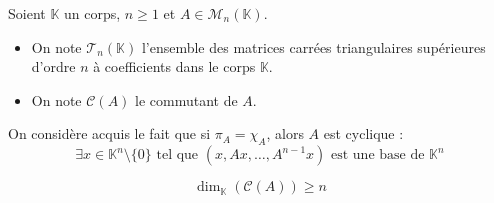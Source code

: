 





  Soient $\mathbb{K}$ un corps, $n \geq 1$ et $A \in \mathcal{M}_n(\mathbb{K})$.

  \begin{notation}
    \begin{itemize}
      \item On note $\mathcal{T}_n(\mathbb{K})$ l'ensemble des matrices carrées triangulaires supérieures d'ordre $n$ à coefficients dans le corps $\mathbb{K}$.
      \item On note $\mathcal{C}(A)$ le commutant de $A$.
    \end{itemize}
  \end{notation}


  \begin{remark}
    \label{dimension-du-commutant-1}
    On considère acquis le fait que si $\pi_A = \chi_A$, alors $A$ est cyclique :
    \[ \exists x \in \mathbb{K}^n \setminus \{ 0 \} \text{ tel que } (x, Ax, \dots, A^{n-1}x) \text{ est une base de } \mathbb{K}^n \]
  \end{remark}


  \begin{lemma}
    \label{dimension-du-commutant-2}
    \[ \dim_{\mathbb{K}}(\mathcal{C}(A)) \geq n \]
  \end{lemma}

